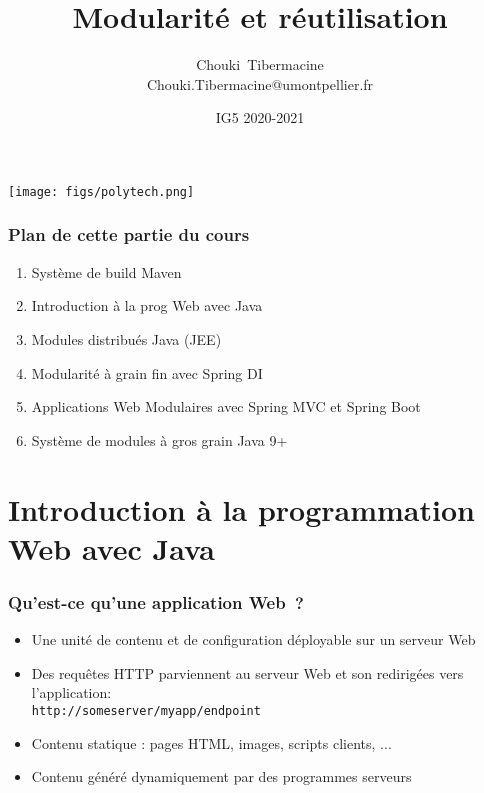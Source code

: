 \documentclass{beamer}
\title[CASI]{\Large{Modularité et réutilisation}}
\author[C. Tibermacine]{\large{Chouki~Tibermacine}\\
\small{Chouki.Tibermacine@umontpellier.fr}}
\date{\tiny{IG5 2020-2021}}
\begin{document}
\begin{frame}
\titlepage
\begin{flushright}
\texttt{[image: figs/polytech.png]}
\end{flushright}
\end{frame}

\begin{frame}
	\frametitle{Plan de cette partie du cours}
	\begin{enumerate}
		\item Système de build Maven
		\item Introduction à la prog Web avec Java
		\item Modules distribués Java (JEE)
		\item Modularité à grain fin avec Spring DI
		\item Applications Web Modulaires avec Spring MVC et Spring Boot
		\item Système de modules à gros grain Java 9+
	\end{enumerate}
\end{frame}



\section{Introduction à la programmation Web avec Java}

\begin{frame}
  \frametitle{Qu'est-ce qu'une application Web~?}
  \begin{itemize}
  \item Une unité de contenu et de configuration déployable sur un serveur Web
  \item Des requêtes HTTP parviennent au serveur Web et son redirigées
    vers l'application:\\
    \texttt{http://{\color{green}someserver}/{\color{red}myapp}/endpoint}
  \item Contenu statique : pages HTML, images, scripts clients, ...
  \item Contenu généré dynamiquement par des programmes serveurs
  \end{itemize}
\end{frame}
\end{document}
